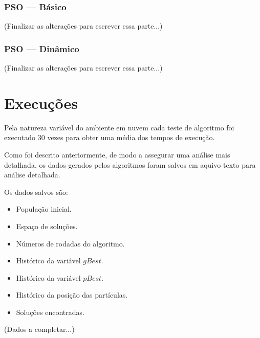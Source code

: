         \subsubsection{PSO — Básico}
            (Finalizar as alterações para escrever essa parte...)

        \subsubsection{PSO — Dinâmico}
            (Finalizar as alterações para escrever essa parte...)

    



\section{Execuções}
    Pela natureza variável do ambiente em nuvem cada teste de algoritmo foi executado 30 vezes para obter uma média dos tempos de execução.\hfill\vspace{\onelineskip}
    
    Como foi descrito anteriormente, de modo a assegurar uma análise mais detalhada, os dados gerados pelos algoritmos foram salvos em aquivo texto para análise detalhada.\hfill\vspace{\onelineskip}
    
    Os dados salvos são:
    \begin{itemize}
        \item População inicial.
        \item Espaço de soluções.
        \item Números de rodadas do algoritmo.
        \item Histórico da variável $gBest$.
        \item Histórico da variável $pBest$.
        \item Histórico da posição das partículas.
        \item Soluções encontradas.
    \end{itemize}
    
    (Dados a completar...)


